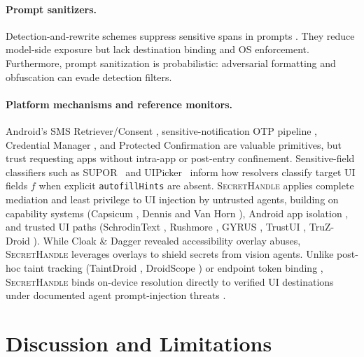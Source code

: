 \documentclass[sigconf,10pt]{acmart}
\newcommand{\SH}{\textsc{SecretHandle}}
\theoremstyle{acmplain}%
\begin{document}
\paragraph{Prompt sanitizers.} Detection-and-rewrite schemes suppress sensitive spans in prompts \cite{siyan2025papillon,zeng2025privacyrestore,chong2024casper}. They reduce model-side exposure but lack destination binding and OS enforcement. Furthermore, prompt sanitization is probabilistic: adversarial formatting and obfuscation can evade detection filters.

\paragraph{Platform mechanisms and reference monitors.} Android's SMS Retriever/Consent \cite{androidSmsRetriever,androidSmsConsent}, sensitive-notification OTP pipeline \cite{android15privacy}, Credential Manager \cite{androidCredentialManager}, and Protected Confirmation \cite{androidProtectedConfirmation} are valuable primitives, but trust requesting apps without intra-app or post-entry confinement. Sensitive-field classifiers such as SUPOR~\cite{huang2015supor} and UIPicker~\cite{nan2015uipicker} inform how resolvers classify target UI fields $f$ when explicit \texttt{autofillHints} are absent. \SH{} applies complete mediation and least privilege \cite{saltzer1975protection} to UI injection by untrusted agents, building on capability systems (Capsicum \cite{watson2010capsicum}, Dennis and Van Horn \cite{dennis1966semantics}), Android app isolation \cite{felt2011permission,bugiel2013flexible,rossi2021seapp}, and trusted UI paths (SchrodinText \cite{continella2020schrodintext}, Rushmore \cite{andrus2015rushmore}, GYRUS \cite{jang2014gyrus}, TrustUI \cite{li2014trustui}, TruZ-Droid \cite{ying2018truzdroid}). While Cloak \& Dagger \cite{fratantonio2017cloak} revealed accessibility overlay abuses, \SH{} leverages overlays to shield secrets from vision agents. Unlike post-hoc taint tracking (TaintDroid \cite{enck2010taintdroid}, DroidScope \cite{yan2012droidscope}) or endpoint token binding \cite{rfc8707,rfc9449,rfc9700,webauthn3,nist80063b,rfc4226,rfc6238}, \SH{} binds on-device resolution directly to verified UI destinations under documented agent prompt-injection threats \cite{du2025mobileattacks,liao2024eia,chen2025fineprint,greshake2023indirect,debenedetti2024agentdojo,zhan2024injecagent}.
\section{Discussion and Limitations}
\label{sec:discussion}
\end{document}

